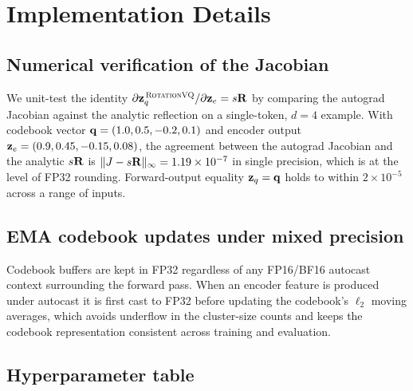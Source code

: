 \section{Implementation Details}
\label{app:implementation}

\subsection{Numerical verification of the Jacobian}

We unit-test the identity $\partial \mathbf{z}_q^{\,\textsc{RotationVQ}} / \partial \mathbf{z}_e = s\mathbf{R}$
by comparing the autograd Jacobian against the analytic reflection
on a single-token, $d=4$ example. With codebook vector $\mathbf{q} =
(1.0, 0.5, -0.2, 0.1)$ and encoder output $\mathbf{z}_e = (0.9, 0.45, -0.15,
0.08)$, the agreement between the autograd Jacobian and the
analytic $s\mathbf{R}$ is $\|J - s\mathbf{R}\|_\infty = 1.19 \times 10^{-7}$
in single precision, which is at the level of FP32 rounding.
Forward-output equality $\mathbf{z}_q = \mathbf{q}$ holds to within $2 \times
10^{-5}$ across a range of inputs.

\subsection{EMA codebook updates under mixed precision}

Codebook buffers are kept in FP32 regardless of any FP16/BF16
autocast context surrounding the forward pass. When an encoder
feature is produced under autocast it is first cast to FP32 before
updating the codebook's $\ell_2$ moving averages, which avoids
underflow in the cluster-size counts and keeps the codebook
representation consistent across training and evaluation.

\subsection{Hyperparameter table}

